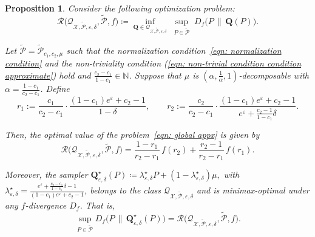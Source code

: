\documentclass[accepted]{article}
\theoremstyle{plain} %
\newtheorem{proposition}[theorem]{Proposition}
\theoremstyle{definition}
\theoremstyle{remark}
\newcommand{\bQ}{\mathbf{Q}}
\begin{document}
\begin{proposition}\label{prop: global appx linear}
    Consider the following optimization problem:
    \begin{equation}\label{eqn: global appx}
        \mathcal{R}\big(\mathcal{Q}_{\mathcal{X}, \tilde{\mathcal{P}}, \varepsilon, \delta}, \tilde{\mathcal{P}}, f\big) 
        \coloneqq 
        \inf_{\bQ \in \mathcal{Q}_{\mathcal{X}, \tilde{\mathcal{P}}, \varepsilon, \delta}} 
        \;\sup_{P \in \tilde{\mathcal{P}}} 
        \;D_f\big(P \, \| \, \bQ(P)\big).
    \end{equation}

    Let $\tilde{\mathcal{P}} = \tilde{\mathcal{P}}_{c_1, c_2, \mu}$ such that the normalization condition~\eqref{eqn: normalization condition} and the non-triviality condition (\ref{eqn: non-trivial condition condition approximate}) hold and $\frac{c_2 - c_1}{1 - c_1} \in \mathbb{N}$. Suppose that $\mu$ is $(\alpha,\frac{1}{\alpha},1)$-decomposable with $\alpha = \frac{1 - c_1}{c_2 - c_1}$. Define
    \[
    r_1 := \frac{c_1}{c_2 - c_1} \cdot \frac{(1 - c_1)e^{\varepsilon} + c_2 - 1}{1 - \delta},
    \qquad
    r_2 := \frac{c_2}{c_2 - c_1} \cdot \frac{(1 - c_1)e^{\varepsilon} + c_2 - 1}{e^{\varepsilon} + \frac{c_2 - 1}{1 - c_1} \delta}.
    \]

    Then, the optimal value of the problem~\eqref{eqn: global appx} is given by
    \begin{equation}\label{eqn: global appx optimal value}
        \mathcal{R}\big(\mathcal{Q}_{\mathcal{X}, \tilde{\mathcal{P}}, \varepsilon, \delta}, \tilde{\mathcal{P}}, f\big)
        = \frac{1 - r_1}{r_2 - r_1} \, f(r_2) + \frac{r_2 - 1}{r_2 - r_1} \, f(r_1).
    \end{equation}

    Moreover, the sampler
    $\bQ^\star_{\varepsilon, \delta}(P) \coloneqq \lambda^\star_{\varepsilon, \delta} P + (1 - \lambda^\star_{\varepsilon, \delta}) \mu,
    $
    with
    $
    \lambda^\star_{\varepsilon, \delta} 
    = \frac{e^{\varepsilon} + \frac{c_2 - c_1}{1 - c_1} \delta - 1}
           {(1 - c_1) e^{\varepsilon} + c_2 - 1}$,
    belongs to the class $\mathcal{Q}_{\mathcal{X}, \tilde{\mathcal{P}}, \varepsilon, \delta}$ and is minimax-optimal under any $f$-divergence $D_f$. That is,
    \begin{equation}\label{eqn: global appx linear is optimal}
        \sup_{P \in \tilde{\mathcal{P}}} D_f\big(P \, \| \, \bQ^\star_{\varepsilon, \delta}(P)\big)
        = \mathcal{R}\big(\mathcal{Q}_{\mathcal{X}, \tilde{\mathcal{P}}, \varepsilon, \delta}, \tilde{\mathcal{P}}, f\big).
    \end{equation}
\end{proposition}
\end{document}

